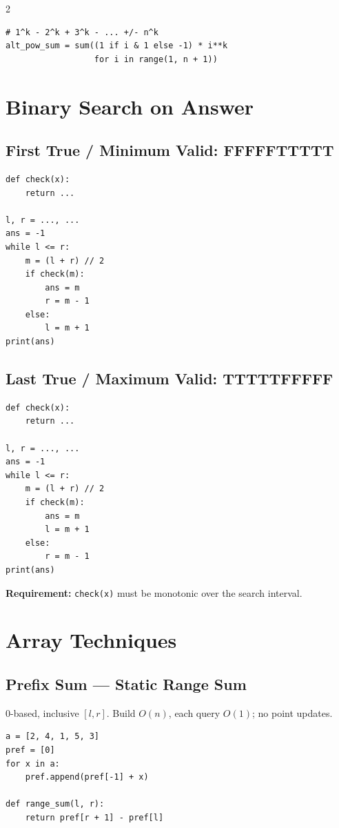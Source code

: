 \documentclass[9pt,a4paper]{extarticle}
\newcommand{\code}[1]{\texttt{#1}}
\begin{document}
\begin{multicols}{2}
\begin{lstlisting}
# 1^k - 2^k + 3^k - ... +/- n^k
alt_pow_sum = sum((1 if i & 1 else -1) * i**k
                  for i in range(1, n + 1))
\end{lstlisting}

\section{Binary Search on Answer}

\subsection{First True / Minimum Valid: FFFFFTTTTT}
\begin{lstlisting}
def check(x):
    return ...

l, r = ..., ...
ans = -1
while l <= r:
    m = (l + r) // 2
    if check(m):
        ans = m
        r = m - 1
    else:
        l = m + 1
print(ans)
\end{lstlisting}

\subsection{Last True / Maximum Valid: TTTTTFFFFF}
\begin{lstlisting}
def check(x):
    return ...

l, r = ..., ...
ans = -1
while l <= r:
    m = (l + r) // 2
    if check(m):
        ans = m
        l = m + 1
    else:
        r = m - 1
print(ans)
\end{lstlisting}

\textbf{Requirement:} \code{check(x)} must be monotonic over the search interval.

\section{Array Techniques}

\subsection{Prefix Sum --- Static Range Sum}
0-based, inclusive $[l,r]$. Build $O(n)$, each query $O(1)$; no point updates.
\begin{lstlisting}
a = [2, 4, 1, 5, 3]
pref = [0]
for x in a:
    pref.append(pref[-1] + x)

def range_sum(l, r):
    return pref[r + 1] - pref[l]


\end{lstlisting}
\end{multicols}
\end{document}
